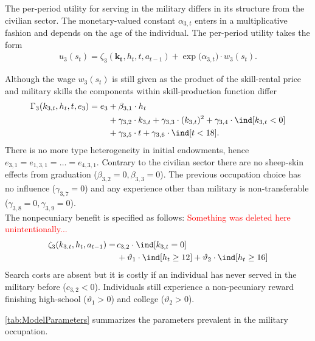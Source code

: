 \FloatBarrier{}
The per-period utility for serving in the military differs in its structure from the civilian sector. The monetary-valued constant $\alpha_{3,t}$ enters in a multiplicative fashion and depends on the age of the individual. The per-period utility takes the form
%
\begin{align}\label{eq:RewardMilitary}
    u_{3}(s_t) = \zeta_3(\bm{k_t}, h_t, t , a_{t -1})  + \exp \big( \alpha_{3, t} \big) \cdot w_{3}(s_t).
\end{align}

Although the wage $w_{3}(s_t)$ is still given as the product of the skill-rental price and military skills the components within skill-production function differ
%
\begin{align}
    \Gamma_3( k_{3,t}, h_t, t, e_3) = e_3 & + \beta_{3,1} \cdot h_t \nonumber \\
	               \nonumber &+ \gamma_{3,2} \cdot  k_{3,t} + \gamma_{3,3} \cdot (k_{3,t})^2 + \gamma_{3,4} \cdot \ind[k_{3,t} < 0] \\
									 & + \gamma_{3,5} \cdot t + \gamma_{3,6} \cdot \ind[t < 18].
\end{align}
%
There is no more type heterogeneity in initial endowments, hence $e_{3,1} = e_{1,3,1} = \dots = e_{4,3,1}$. Contrary to the civilian sector there are no sheep-skin effects from graduation ($\beta_{3,2} = 0, \beta_{3,3}= 0$). The previous occupation choice has no influence ($\gamma_{3,7}= 0$) and any experience other than military is non-transferable ($\gamma_{3,8} = 0, \gamma_{3,9} = 0$). \\

The nonpecuniary benefit is specified as follows: \textcolor{red}{Something was deleted here unintentionally...}
%
\begin{align*}
\zeta_{3}( k_{3.t}, h_t, a_{t-1} )  = \,& c_{3,2} \cdot \ind[k_{3,t} = 0] \nonumber \\
  & + \vartheta_1 \cdot \ind[h_t \geq 12] + \vartheta_2 \cdot \ind[h_t \geq 16]
\end{align*}
Search costs are absent but it is costly if an individual has never served in the military before ($c_{3,2} < 0$). Individuals still experience a non-pecuniary reward finishing high-school ($\vartheta_1 >0$) and college ($\vartheta_2 > 0$).

\autoref{tab:ModelParameters} summarizes the parameters prevalent in the military occupation.


